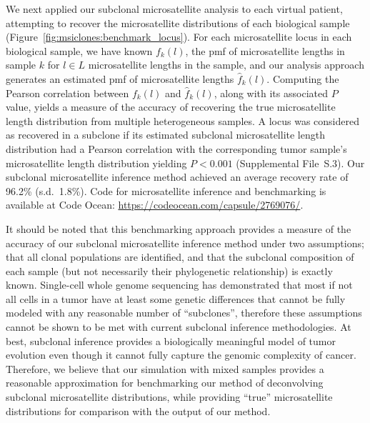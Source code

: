 We next applied our subclonal microsatellite analysis to each virtual patient, attempting to recover the microsatellite distributions of each biological sample (Figure~\ref{fig:msiclones:benchmark_locus}). For each microsatellite locus in each biological sample, we have known $f_k(l)$, the pmf of microsatellite lengths in sample $k$ for $l \in L$ microsatellite lengths in the sample, and our analysis approach generates an estimated pmf of microsatellite lengths $\hat{f}_k(l)$. Computing the Pearson correlation between $f_k(l)$ and $\hat{f}_k(l)$, along with its associated $P$ value, yields a measure of the accuracy of recovering the true microsatellite length distribution from multiple heterogeneous samples. A locus was considered as recovered in a subclone if its estimated subclonal microsatellite length distribution had a Pearson correlation with the corresponding tumor sample's microsatellite length distribution yielding $P < 0.001$ (Supplemental File~S\thechapter{}.3). Our subclonal microsatellite inference method achieved an average recovery rate of 96.2\% (s.d.\ 1.8\%). Code for microsatellite inference and benchmarking is available at Code Ocean: \url{https://codeocean.com/capsule/2769076/}.

It should be noted that this benchmarking approach provides a measure of the accuracy of our subclonal microsatellite inference method under two assumptions; that all clonal populations are identified, and that the subclonal composition of each sample (but not necessarily their phylogenetic relationship) is exactly known. Single-cell whole genome sequencing \cite{navin2011} has demonstrated that most if not all cells in a tumor have at least some genetic differences that cannot be fully modeled with any reasonable number of ``subclones'', therefore these assumptions cannot be shown to be met with current subclonal inference methodologies. At best, subclonal inference provides a biologically meaningful model of tumor evolution even though it cannot fully capture the genomic complexity of cancer. Therefore, we believe that our simulation with mixed samples provides a reasonable approximation for benchmarking our method of deconvolving subclonal microsatellite distributions, while providing ``true'' microsatellite distributions for comparison with the output of our method.

